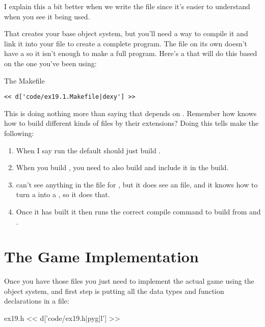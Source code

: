I explain this a bit better when we write the  file since it's
easier to understand when you see it being used.

That creates your base object system, but you'll need a way to compile it
and link it into your  file to create a complete program.  The
 file on its own doesn't have a  so it isn't
enough to make a full program.  Here's a  that will do this
based on the one you've been using:

\begin{code}{The Makefile}
\begin{lstlisting}
<< d['code/ex19.1.Makefile|dexy'] >>
\end{lstlisting}
\end{code}

This  is doing nothing more than saying that 
depends on .  Remember how  knows how to build
different kinds of files by their extensions?  Doing this tells make the
following:

\begin{enumerate}
\item When I say run  the default  should just build
    .
\item When you build , you need to also build 
    and include it in the build.
\item {} can't see anything in the file for , but it does
    see an  file, and it knows how to turn a  into
    a , so it does that.
\item Once it has  built it then runs the correct compile
    command to build  from  and .
\end{enumerate}


\section{The Game Implementation}

Once you have those files you just need to implement the actual game
using the object system, and first step is putting all the data types
and function declarations in a  file:

\begin{code}{ex19.h}
<< d['code/ex19.h|pyg|l'] >>
\end{code}

